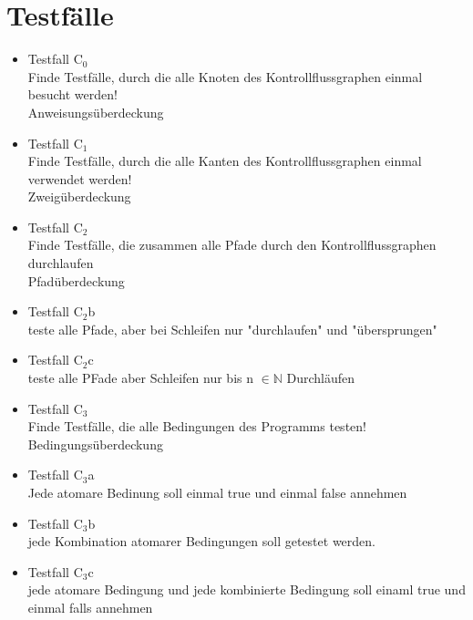 \section{Testfälle}
\begin{itemize}
\item Testfall C$_{0}$ \\ Finde Testfälle, durch die alle Knoten des Kontrollflussgraphen einmal besucht werden! \\ Anweisungsüberdeckung
\item Testfall C$_{1}$ \\ Finde Testfälle, durch die alle Kanten des Kontrollflussgraphen einmal verwendet werden! \\ Zweigüberdeckung
\item Testfall C$_{2}$ \\ Finde Testfälle, die zusammen alle Pfade durch den Kontrollflussgraphen durchlaufen \\ Pfadüberdeckung 
\item Testfall C$_{2}$b \\ teste alle Pfade, aber bei Schleifen nur "durchlaufen" und "übersprungen"
\item Testfall C$_{2}$c \\ teste alle PFade aber Schleifen nur bis n $\in \mathbb{N}$ Durchläufen
\item Testfall C$_{3}$ \\ Finde Testfälle, die alle Bedingungen des Programms testen! \\ Bedingungsüberdeckung 
\item Testfall C$_{3}$a \\ Jede atomare Bedinung soll einmal true und einmal false annehmen
\item Testfall C$_{3}$b \\ jede Kombination atomarer Bedingungen soll getestet werden.
\item Testfall C$_{3}$c \\ jede atomare Bedingung und jede kombinierte Bedingung soll einaml true und einmal falls annehmen
%
%
%

\end{itemize}
